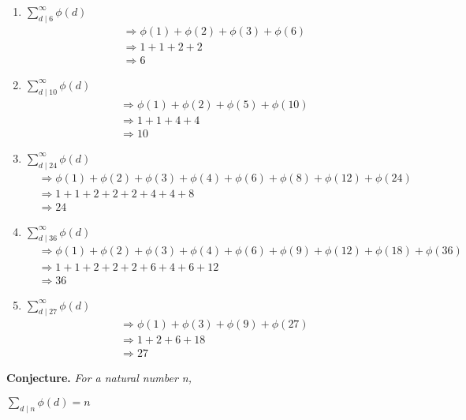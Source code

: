 \documentclass{article}
\begin{document}
\begin{enumerate}
    \item $\sum_{d \mid 6}^\infty \phi(d)$
    \begin{align*}
        &\Longrightarrow \phi(1) + \phi(2) + \phi(3) + \phi(6)&\\
        &\Longrightarrow 1 + 1 + 2 + 2&\\
        &\Longrightarrow 6&
    \end{align*}
    \item $\sum_{d \mid 10}^\infty \phi(d)$
    \begin{align*}
        &\Longrightarrow \phi(1) + \phi(2) + \phi(5) + \phi(10)&\\
        &\Longrightarrow 1 + 1 + 4 + 4&\\
        &\Longrightarrow 10&
    \end{align*}
    \item $\sum_{d \mid 24}^\infty \phi(d)$
    \begin{align*}
        &\Longrightarrow \phi(1) + \phi(2) + \phi(3) + \phi(4) + \phi(6) + \phi(8) + \phi(12) + \phi(24)&\\
        &\Longrightarrow 1 + 1 + 2 + 2 + 2 + 4 + 4 + 8&\\
        &\Longrightarrow 24&
    \end{align*}
    \item $\sum_{d \mid 36}^\infty \phi(d)$
    \begin{align*}
        &\Longrightarrow \phi(1) + \phi(2) + \phi(3) + \phi(4) + \phi(6) + \phi(9) + \phi(12) + \phi(18) + \phi(36)&\\
        &\Longrightarrow 1 + 1 + 2 + 2 + 2 + 6 + 4 + 6 + 12&\\
        &\Longrightarrow 36&
    \end{align*}
    \item $\sum_{d \mid 27}^\infty \phi(d)$
    \begin{align*}
        &\Longrightarrow \phi(1) + \phi(3) + \phi(9) + \phi(27)&\\
        &\Longrightarrow 1 + 2 + 6 + 18&\\
        &\Longrightarrow 27&
    \end{align*}
\end{enumerate}

\textbf{Conjecture.} \textit{For a natural number n,}
\begin{center}
    $\sum_{d \mid n} \phi(d) = n$
\end{center}
\end{document}
